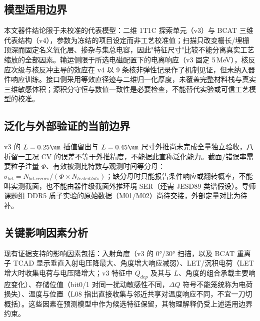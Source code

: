 \subsection{模型适用边界}

本文器件结论限于未校准的代表模型：二维 1T1C 探索单元（v3）与 BCAT 三维代表结构（v4），参数为冻结的项目设定而非工艺校准值；扫描只改变栅长/埋栅顶深而固定名义氧化层、掺杂与集总电容，因此"特征尺寸"比较不能分离真实工艺缩放的全部因素。输运侧限于所选电磁配置下的电离响应（v3 固定 5\,MeV），核反应次级与核反冲主导的效应在 v4 以 9 条核非弹性记录作了机制见证，但未纳入器件响应训练。接口侧采用等效直径迹与二维归一化厚度，未覆盖完整材料栈与真实三维敏感体积；源积分守恒与数值一致性是必要检查，不能替代实验或可信工艺模型的校准。

\subsection{泛化与外部验证的当前边界}

v3 的 $L=0.25\um$ 插值留出与 $L=0.45\um$ 尺寸外推尚未完成全量独立验收，八折留一工况 CV 的误差不等于外推精度，不能据此宣称泛化能力。截面/错误率需要粒子注量 $\Phi$、有效被测比特数与观测时间等分母：$\sigma_{bit}=N_{bit\ errors}/(\Phi\times N_{tested\ bits})$；缺分母时只能报告条件响应或翻转概率，不能叫实测截面，也不能由器件级截面外推环境 SER（还需 JESD89 类谱假设）。导师课题组 DDR5 质子实验的原始数据（M01/M02）尚待交接，外部定量对比为待补。

\subsection{关键影响因素分析}

现有证据支持的影响因素包括：入射角度（v3 的 0°/30° 扫描，以及 BCAT 重离子 TCAD 显示垂直入射电压降最大、角度增大响应减弱\cite{kim2025bcat}）、LET/沉积电荷（LET 增大时收集电荷与电压降增大\cite{kim2025bcat}；v3 特征中 $Q_{dep}$ 及其与 $L$、角度的组合承载主要响应变化）、存储位值（bit0/1 对同一扰动敏感性不同，$\Delta Q$ 符号不能笼统称为电荷损失）、温度与位置（L08 指出直接收集与邻近共享对温度响应不同，不宜一刀切概括）。这些因素在预测模型中作为候选特征保留，其物理解释仍受上述适用边界约束。
